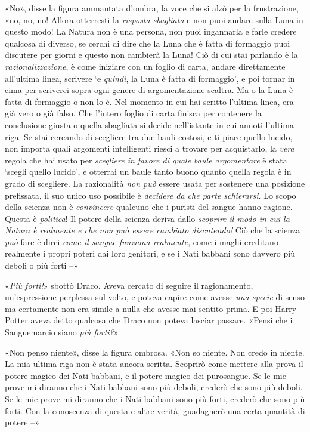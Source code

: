 «No», disse la figura ammantata d’ombra, la voce che si alzò per la frustrazione, «no, no, no! Allora otterresti la \textit{risposta sbagliata} e non puoi andare sulla Luna in questo modo! La Natura non è una persona, non puoi ingannarla e farle credere qualcosa di diverso, se cerchi di dire che la Luna che è fatta di formaggio puoi discutere per giorni e questo non cambierà la Luna! Ciò di cui stai parlando è la \textit{razionalizzazione}, è come iniziare con un foglio di carta, andare direttamente all’ultima linea, scrivere ‘e \textit{quindi}, la Luna è fatta di formaggio’, e poi tornar in cima per scriverci sopra ogni genere di argomentazione scaltra. Ma o la Luna è fatta di formaggio o non lo è. Nel momento in cui hai scritto l’ultima linea, era già vero o già falso. Che l’intero foglio di carta finisca per contenere la conclusione giusta o quella sbagliata si decide nell’istante in cui annoti l’ultima riga. Se stai cercando di scegliere tra due bauli costosi, e ti piace quello lucido, non importa quali argomenti intelligenti riesci a trovare per acquistarlo, la \textit{vera} regola che hai usato per \textit{scegliere in favore di quale baule argomentare} è stata ‘scegli quello lucido’, e otterrai un baule tanto buono quanto quella regola è in grado di scegliere. La razionalità \textit{non può} essere usata per sostenere una posizione prefissata, il suo unico uso possibile è \textit{decidere da che parte schierarsi}. Lo scopo della scienza non è \textit{convincere} qualcuno che i puristi del sangue hanno ragione. Questa è \textit{politica}! Il potere della scienza deriva dallo \textit{scoprire il modo in cui la Natura è realmente e che non può essere cambiato discutendo!} Ciò che la scienza \textit{può} fare è dirci \textit{come il sangue funziona realmente}, come i maghi ereditano realmente i propri poteri dai loro genitori, e se i Nati babbani sono davvero più deboli o più forti –»

«\textit{Più forti!}» sbottò Draco. Aveva cercato di seguire il ragionamento, un’espressione perplessa sul volto, e poteva capire come avesse \textit{una specie} di senso ma certamente non era simile a nulla che avesse mai sentito prima. E poi Harry Potter aveva detto qualcosa che Draco non poteva lasciar passare. «Pensi che i Sanguemarcio siano \textit{più forti?}»

«Non penso niente», disse la figura ombrosa. «Non so niente. Non credo in niente. La mia ultima riga non è stata ancora scritta. Scoprirò come mettere alla prova il potere magico dei Nati babbani, e il potere magico dei purosangue. Se le mie prove mi diranno che i Nati babbani sono più deboli, crederò che sono più deboli. Se le mie prove mi diranno che i Nati babbani sono più forti, crederò che sono più forti. Con la conoscenza di questa e altre verità, guadagnerò una certa quantità di potere –»

